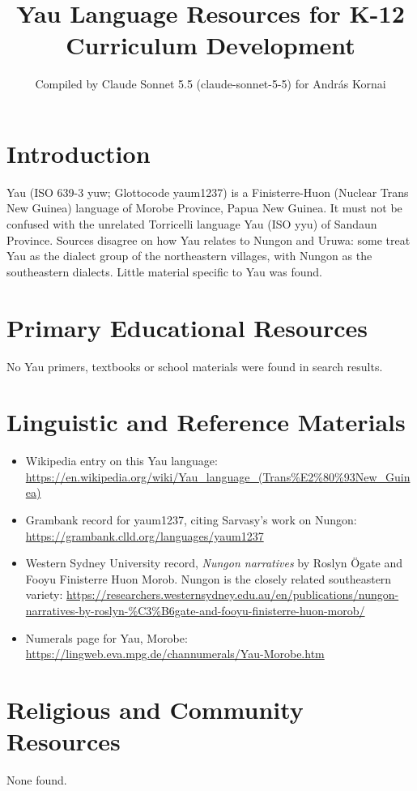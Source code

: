 \documentclass[12pt]{article}
\title{Yau Language Resources for K-12 Curriculum Development}
\author{Compiled by Claude Sonnet 5.5 (claude-sonnet-5-5) for Andr\'as Kornai}
\date{}
\begin{document}
\maketitle

\section{Introduction}
Yau (ISO 639-3 yuw; Glottocode yaum1237) is a Finisterre-Huon (Nuclear Trans New Guinea) language of Morobe Province, Papua New Guinea. It must not be confused with the unrelated Torricelli language Yau (ISO yyu) of Sandaun Province. Sources disagree on how Yau relates to Nungon and Uruwa: some treat Yau as the dialect group of the northeastern villages, with Nungon as the southeastern dialects. Little material specific to Yau was found.

\section{Primary Educational Resources}
No Yau primers, textbooks or school materials were found in search results.

\section{Linguistic and Reference Materials}
\begin{itemize}
\item Wikipedia entry on this Yau language: \url{https://en.wikipedia.org/wiki/Yau_language_(Trans%E2%80%93New_Guinea)}
\item Grambank record for yaum1237, citing Sarvasy's work on Nungon: \url{https://grambank.clld.org/languages/yaum1237}
\item Western Sydney University record, \emph{Nungon narratives} by Roslyn \"Ogate and Fooyu Finisterre Huon Morob. Nungon is the closely related southeastern variety: \url{https://researchers.westernsydney.edu.au/en/publications/nungon-narratives-by-roslyn-%C3%B6gate-and-fooyu-finisterre-huon-morob/}
\item Numerals page for Yau, Morobe: \url{https://lingweb.eva.mpg.de/channumerals/Yau-Morobe.htm}
\end{itemize}

\section{Religious and Community Resources}
None found.
\end{document}
